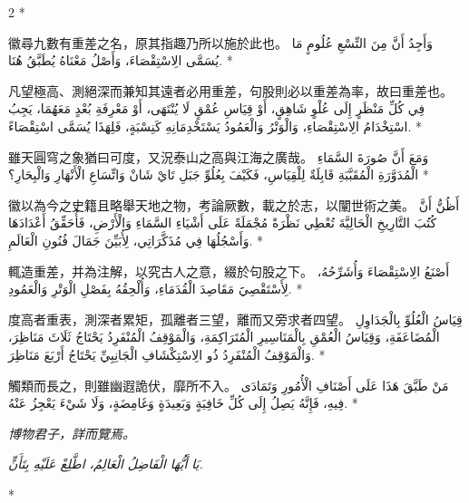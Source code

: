 \documentclass[11pt,a4paper]{article}
\newcommand{\ar}[1]{\arabicfont\beginR #1\endR}
\newenvironment{bilingual}{%
  \begin{paracol}{2}%
  \switchcolumn[0]*%
}{%
  \end{paracol}%
}
\newcommand{\cnline}[1]{\switchcolumn[0]\noindent #1 \switchcolumn[1]}
\newcommand{\arline}[1]{\noindent\ar{#1} \switchcolumn[0]*}
\newenvironment{prob bilingual}{%
  \begin{paracol}{2}%
  \switchcolumn[0]*%
}{%
  \end{paracol}%
  \vspace{0.3em}%
}
\begin{document}
\begin{bilingual}
\cnline{%
徽尋九數有重差之名，原其指趣乃所以施於此也。
}
\arline{%
وَأَجِدُ أَنَّ مِنَ التِّسْعِ عُلُومٍ مَا يُسَمَّى الِاسْتِقْصَاءَ، وَأَصْلُ مَعْنَاهُ يُطَبَّقُ هُنَا.
}

\cnline{%
凡望極高、測絕深而兼知其遠者必用重差，句股則必以重差為率，故曰重差也。
}
\arline{%
فِي كُلِّ مَنْظَرٍ إِلَى عُلْوٍ شَاهِقٍ، أَوْ قِيَاسِ عُمْقٍ لَا يُنْتَهَى، أَوْ مَعْرِفَةِ بُعْدٍ مَعَهُمَا، يَجِبُ اسْتِخْدَامُ الِاسْتِقْصَاءِ، وَالْوَتْرُ وَالْعَمُودُ يَسْتَخْدِمَانِهِ كَنِسْبَةٍ، فَلِهَذَا يُسَمَّى اسْتِقْصَاءً.
}

\cnline{%
雖天圓穹之象猶曰可度，又況泰山之高與江海之廣哉。
}
\arline{%
وَمَعَ أَنَّ صُورَةَ السَّمَاءِ الْمُدَوَّرَةِ الْمُقَبَّبَةِ قَابِلَةٌ لِلْقِيَاسِ، فَكَيْفَ بِعُلُوِّ جَبَلِ تَايْ شَانْ وَاتِّسَاعِ الْأَنْهَارِ وَالْبِحَارِ؟
}

\cnline{%
徽以為今之史籍且略舉天地之物，考論厥數，載之於志，以闡世術之美。
}
\arline{%
أَظُنُّ أَنَّ كُتُبَ التَّارِيخِ الْحَالِيَّةَ تُعْطِي نَظْرَةً مُجْمَلَةً عَلَى أَشْيَاءِ السَّمَاءِ وَالْأَرْضِ، فَأُحَقِّقُ أَعْدَادَهَا وَأَسْجُلُهَا فِي مُذَكَّرَاتِي، لِأُبَيِّنَ جَمَالَ فُنُونِ الْعَالَمِ.
}

\cnline{%
輒造重差，并為注解，以究古人之意，綴於句股之下。
}
\arline{%
أَصْنَعُ الِاسْتِقْصَاءَ وَأُشَرِّحُهُ، لِأَسْتَقْصِيََ مَقَاصِدَ الْقُدَمَاءِ، وَأُلْحِقُهُ بِفَصْلِ الْوَتْرِ وَالْعَمُودِ.
}

\cnline{%
度高者重表，測深者累矩，孤離者三望，離而又旁求者四望。
}
\arline{%
قِيَاسُ الْعُلُوِّ بِالْجَدَاوِلِ الْمُضَاعَفَةِ، وَقِيَاسُ الْعُمْقِ بِالْمَنَاسِيرِ الْمُتَرَاكِمَةِ، وَالْمَوْقِفُ الْمُنْفَرِدُ يَحْتَاجُ ثَلَاثَ مَنَاظِرَ، وَالْمَوْقِفُ الْمُنْفَرِدُ ذُو الِاسْتِكْشَافِ الْجَانِبِيِّ يَحْتَاجُ أَرْبَعَ مَنَاظِرَ.
}

\cnline{%
觸類而長之，則雖幽遐詭伏，靡所不入。
}
\arline{%
مَنْ طَبَّقَ هَذَا عَلَى أَصْنَافِ الْأُمُورِ وَتَمَادَى فِيهِ، فَإِنَّهُ يَصِلُ إِلَى كُلِّ خَافِيَةٍ وَبَعِيدَةٍ وَغَامِضَةٍ، وَلَا شَيْءَ يَعْجِزُ عَنْهُ.
}

\cnline{%
\begin{flushright}
\textit{博物君子，詳而覽焉。}
\end{flushright}
}
\arline{%
\begin{flushleft}
\textit{\ar{يَا أَيُّهَا الْفَاضِلُ الْعَالِمُ، اطَّلِعْ عَلَيْهِ بِتَأَنٍّ.}}
\end{flushleft}
}
\end{bilingual}

\newpage


\end{document}
